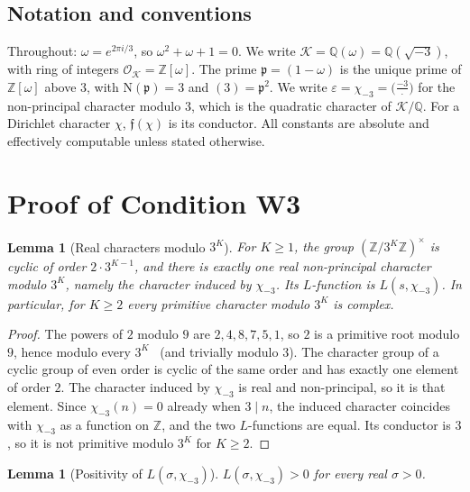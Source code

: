 \documentclass[12pt]{amsart}
\theoremstyle{plain}
\newtheorem{lemma}[theorem]{Lemma}
\theoremstyle{definition}
\theoremstyle{remark}
\newcommand{\Z}{\mathbb{Z}}
\newcommand{\Q}{\mathbb{Q}}
\newcommand{\Zomega}{\Z[\omega]}
\newcommand{\Qomega}{\Q(\omega)}
\newcommand{\K}{\mathcal{K}}          %
\newcommand{\OK}{\mathcal{O}_{\K}}
\newcommand{\Nf}{\mathrm{N}}          %
\newcommand{\cond}{\mathfrak{f}}      %
\newcommand{\pp}{\mathfrak{p}}        %
\begin{document}
\subsection{Notation and conventions}

Throughout: $\omega = e^{2\pi i/3}$, so $\omega^2 + \omega + 1 = 0$.
We write $\K = \Qomega = \Q(\sqrt{-3})$, with ring of integers
$\OK = \Zomega$. The prime $\pp = (1-\omega)$ is the unique prime of
$\Zomega$ above $3$, with $\Nf(\pp) = 3$ and $(3) = \pp^2$. We write
$\varepsilon = \chi_{-3} = \bigl(\tfrac{-3}{\cdot}\bigr)$ for the
non-principal character modulo $3$, which is the quadratic character of
$\K/\Q$. For a Dirichlet character $\chi$, $\cond(\chi)$ is its conductor.
All constants are absolute and effectively computable unless stated
otherwise.

\section{Proof of Condition W3}
\label{sec:proof}

\begin{lemma}[Real characters modulo $3^K$]
\label{lem:real}
For $K \geq 1$, the group $(\Z/3^K\Z)^\times$ is cyclic of order
$2\cdot 3^{K-1}$, and there is exactly one real non-principal character
modulo $3^K$, namely the character induced by $\chi_{-3}$. Its $L$-function
is $L(s,\chi_{-3})$. In particular, for $K \geq 2$ every primitive character
modulo $3^K$ is complex.
\end{lemma}

\begin{proof}
The powers of $2$ modulo $9$ are $2, 4, 8, 7, 5, 1$, so $2$ is a primitive
root modulo $9$, hence modulo every $3^K$~\cite[Ch.~4]{IrelandRosen1990}
(and trivially modulo $3$). The character group of a cyclic group of even
order is cyclic of the same order and has exactly one element of order $2$.
The character induced by $\chi_{-3}$ is real and non-principal, so it is
that element. Since $\chi_{-3}(n) = 0$ already when $3 \mid n$, the induced
character coincides with $\chi_{-3}$ as a function on $\Z$, and the two
$L$-functions are equal. Its conductor is $3$, so it is not primitive
modulo $3^K$ for $K \geq 2$.
\end{proof}

\begin{lemma}[Positivity of $L(\sigma,\chi_{-3})$]
\label{lem:positive}
$L(\sigma,\chi_{-3}) > 0$ for every real $\sigma > 0$.
\end{lemma}
\end{document}
